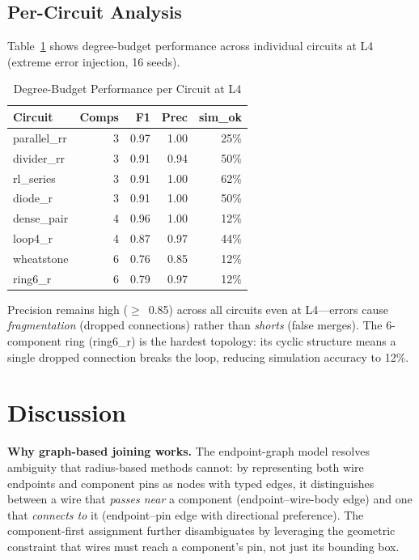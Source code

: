 \documentclass[conference]{IEEEtran}
\begin{document}
\subsection{Per-Circuit Analysis}

Table~\ref{tab:per_circuit} shows degree-budget performance across individual circuits at L4 (extreme error injection, 16 seeds).

\begin{table}[htbp]
\caption{Degree-Budget Performance per Circuit at L4}
\label{tab:per_circuit}
\begin{center}
\begin{tabular}{lrrrr}
\toprule
\textbf{Circuit} & \textbf{Comps} & \textbf{F1} & \textbf{Prec} & \textbf{sim\_ok} \\
\midrule
parallel\_rr & 3 & 0.97 & 1.00 & 25\% \\
divider\_rr & 3 & 0.91 & 0.94 & 50\% \\
rl\_series & 3 & 0.91 & 1.00 & 62\% \\
diode\_r & 3 & 0.91 & 1.00 & 50\% \\
dense\_pair & 4 & 0.96 & 1.00 & 12\% \\
loop4\_r & 4 & 0.87 & 0.97 & 44\% \\
wheatstone & 6 & 0.76 & 0.85 & 12\% \\
ring6\_r & 6 & 0.79 & 0.97 & 12\% \\
\bottomrule
\end{tabular}
\end{center}
\end{table}

Precision remains high ($\geq$~0.85) across all circuits even at L4---errors cause \emph{fragmentation} (dropped connections) rather than \emph{shorts} (false merges). The 6-component ring (ring6\_r) is the hardest topology: its cyclic structure means a single dropped connection breaks the loop, reducing simulation accuracy to 12\%.

\section{Discussion}

\textbf{Why graph-based joining works.} The endpoint-graph model resolves ambiguity that radius-based methods cannot: by representing both wire endpoints and component pins as nodes with typed edges, it distinguishes between a wire that \emph{passes near} a component (endpoint--wire-body edge) and one that \emph{connects to} it (endpoint--pin edge with directional preference). The component-first assignment further disambiguates by leveraging the geometric constraint that wires must reach a component's pin, not just its bounding box.
\end{document}
